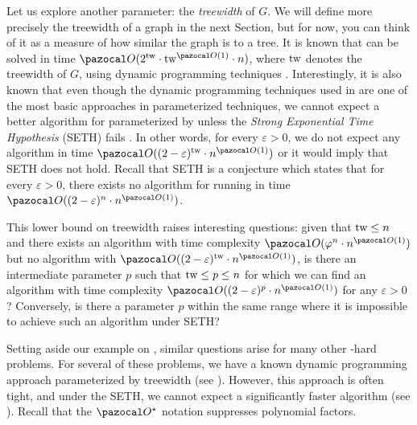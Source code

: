 Let us explore another parameter: the \textit{treewidth} of $G$. We will define more precisely the treewidth of a graph in the next Section, but for now, you can think of it as a measure of how similar the graph is to a tree. It is known that  can be solved in time $\O(2^{\tw}\cdot\tw^{\O(1)}\cdot n)$, where $\text{tw}$ denotes the treewidth of $G$, using dynamic programming techniques \cite[Corollary~7.6]{cygan2015parameterized}. Interestingly, it is also known that even though the dynamic programming techniques used in \cite[Corollary~7.6]{cygan2015parameterized} are one of the most basic approaches in parameterized techniques, we cannot expect a better algorithm for  parameterized by \tw{} unless the \textit{Strong Exponential Time Hypothesis} (SETH) fails \cite{lokshtanov2011known}. In other words, for every $\varepsilon > 0$, we do not expect any algorithm in time $\O((2-\varepsilon)^\tw \cdot n^{\O(1)})$ or it would imply that SETH does not hold. Recall that SETH is a conjecture which states that for every $\varepsilon > 0$, there exists no algorithm for  running in time $\O((2 - \varepsilon)^n\cdot n^{\O(1)})$.

This lower bound on treewidth raises interesting questions: given that $\text{tw}{} \leq n$ and there exists an algorithm with time complexity $\O(\varphi^n \cdot n^{\O(1)})$ but no algorithm with $\O((2 - \varepsilon)^\tw  \cdot n^{\O(1)})$, is there an intermediate parameter $p$ such that $\text{tw} \leq p \leq n$ for which we can find an algorithm with time complexity $\O((2 - \varepsilon)^p \cdot n^{\O(1)})$ for any $\varepsilon > 0$?  Conversely, is there a parameter $p$ within the same range where it is impossible to achieve such an algorithm under SETH?

\medskip

Setting aside our example on , similar questions arise for many other \NP-hard problems. For several of these problems, we have a known dynamic programming approach parameterized by treewidth (see ). However, this approach is often tight, and under the SETH, we cannot expect a significantly faster algorithm (see ). Recall that the $\O^\star$ notation suppresses polynomial factors.

